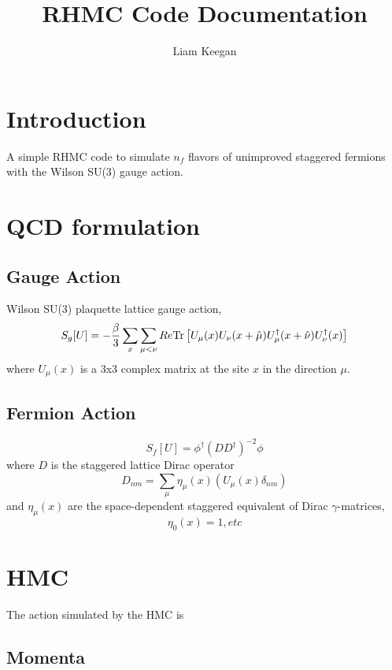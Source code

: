 \documentclass[a4paper,12pt]{article}
\newcommand{\Tr}{{\rm Tr}}
\begin{document}
\author{Liam Keegan}
\title{RHMC Code Documentation}

\maketitle

\section{Introduction}
A simple RHMC code to simulate $n_f$ flavors of unimproved staggered fermions with the Wilson SU(3) gauge action.

\section{QCD formulation}
\subsection{Gauge Action}
Wilson SU(3) plaquette lattice gauge action,
\begin{equation}
 S_g[U] = -\frac{\beta}{3} \sum_x \sum_{\mu<\nu} Re \Tr \left[ U_{\mu}(x)  U_{\nu}(x+\hat\mu)  U_{\mu}^{\dagger}(x+\hat\nu)  U_{\nu}^{\dagger}(x)\right]
\end{equation}
where $U_\mu(x)$ is a 3x3 complex matrix at the site $x$ in the direction $\mu$.

\subsection{Fermion Action}
\begin{equation}
 S_f[U] = \phi^{\dagger} (D D^{\dagger})^{-2} \phi
\end{equation}
where $D$ is the staggered lattice Dirac operator
\begin{equation}
 D_{nm} = \sum_{\mu} \eta_{\mu}(x) \left( U_{\mu}(x) \delta_{n m} \right)
\end{equation}
and $\eta_{\mu}(x)$ are the space-dependent staggered equivalent of Dirac $\gamma$-matrices,
\begin{equation}
 \eta_{0}(x) = 1, etc
\end{equation}

\section{HMC}
The action simulated by the HMC is

\subsection{Momenta}
\end{document}
